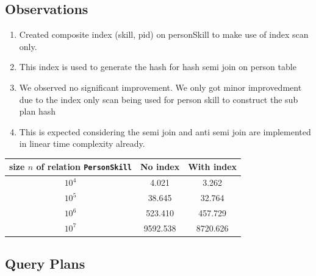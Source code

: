 \documentclass{article}
\begin{document}
    \subsection*{Observations}
    \begin{center}
      \begin{enumerate}
        \item Created composite index (skill, pid) on personSkill to make use of index scan only.
        \item This index is used to generate the hash for hash semi join on person table
        \item We observed no significant improvement. We only got minor improvedment due to the index only scan being used for person skill to construct the sub plan hash
        \item This is expected considering the semi join and anti semi join are implemented in linear time complexity already.
      \end{enumerate}
      \vspace*{10pt}
      {\normalsize
        \begin{tabular}{c|c|c}
        size $n$ of relation {\tt PersonSkill} & No index & With index \\ \hline
        $10^4$ & 4.021 & 3.262\\
        $10^5$ & 38.645 &  32.764\\
        $10^6$ & 523.410 &  457.729\\
        $10^7$ & 9592.538 & 8720.626 \\
        \end{tabular}
      }
      \end{center}
    \subsection*{Query Plans}
\end{document}
